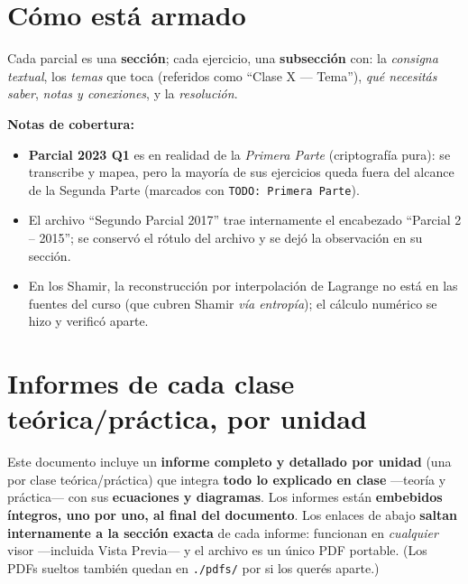\documentclass[11pt,a4paper]{article}
\begin{document}
\bigskip
\section*{Cómo está armado}
Cada parcial es una \textbf{sección}; cada ejercicio, una \textbf{subsección} con: la
\emph{consigna textual}, los \emph{temas} que toca (referidos como ``Clase X — Tema''), \emph{qué
necesitás saber}, \emph{notas y conexiones}, y la \emph{resolución}.

\medskip
\noindent\textbf{Notas de cobertura:}
\begin{itemize}[leftmargin=1.4em,itemsep=2pt]
  \item \textbf{Parcial 2023 Q1} es en realidad de la \emph{Primera Parte} (criptografía pura):
        se transcribe y mapea, pero la mayoría de sus ejercicios queda fuera del alcance de la
        Segunda Parte (marcados con \texttt{TODO: Primera Parte}).
  \item El archivo ``Segundo Parcial 2017'' trae internamente el encabezado ``Parcial 2 -- 2015'';
        se conservó el rótulo del archivo y se dejó la observación en su sección.
  \item En los Shamir, la reconstrucción por interpolación de Lagrange no está en las fuentes del
        curso (que cubren Shamir \emph{vía entropía}); el cálculo numérico se hizo y verificó aparte.
\end{itemize}

\section*{Informes de cada clase teórica/práctica, por unidad}
Este documento incluye un \textbf{informe completo y detallado por unidad} (una por clase
teórica/práctica) que integra \textbf{todo lo explicado en clase} —teoría y práctica— con sus
\textbf{ecuaciones y diagramas}. Los informes están \textbf{embebidos íntegros, uno por uno, al
final del documento}. Los enlaces de abajo \textbf{saltan internamente a la sección exacta} de
cada informe: funcionan en \emph{cualquier} visor —incluida Vista Previa— y el archivo es un
único PDF portable. (Los PDFs sueltos también quedan en \texttt{./pdfs/} por si los querés aparte.)
\end{document}
